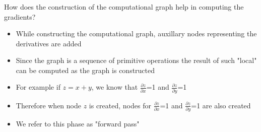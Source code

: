 \documentclass{beamer}
\theoremstyle{plain} %
\theoremstyle{example} %
\newcommand{\deriv}[2]{\ensuremath{\frac{\partial #1}{\partial #2}}}
\begin{document}
\begin{frame}
    \frametitle{}
    How does the construction of the computational graph help in computing the gradients?
\begin{itemize}
    
    \item While constructing the computational graph, auxillary nodes representing the derivatives are added
    \item Since the graph is a sequence of primitive operations the result of such "local" can be computed as the graph is constructed  
    \item For example if $z=x+y$, we know that \deriv{z}{x}=1 and \deriv{z}{y}=1
    \item Therefore when node $z$ is created, nodes for \deriv{z}{x}=1 and \deriv{z}{y}=1 are also created
    \item We refer to this phase as "forward pass"
\end{itemize}
    

\end{frame}
\end{document}
